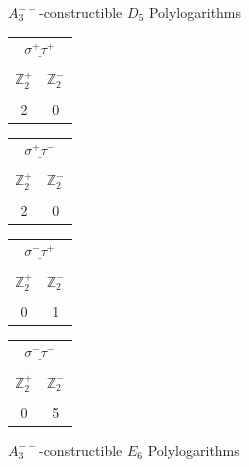 \documentclass[11pt]{article}
\begin{document}
\begin{table}
\begin{center}
\vspace{.6cm}
$A_3^{--}$-constructible $D_5$ Polylogarithms
\vspace{.2cm}

\begin{tabular}{c | c |}
\multicolumn{2}{c}{$\underline{\ \sigma^+ \tau^+ \ }$} \\[-1em]
\multicolumn{1}{c}{} & \multicolumn{1}{c}{} \\
 $\mathbb{Z}_2^+$ & \multicolumn{1}{c}{$\mathbb{Z}_2^-$} \\[-1em]
 & \multicolumn{1}{c}{} \\
\hline
2 & \multicolumn{1}{c}{0} 
\end{tabular} 
\hspace{1.2cm}
\begin{tabular}{ c | c |}
\multicolumn{2}{c}{$\underline{\ \sigma^+ \tau^-\ }$} \\[-1em]
\multicolumn{1}{c}{} & \multicolumn{1}{c}{} \\
 $\mathbb{Z}_2^+$ & \multicolumn{1}{c}{$\mathbb{Z}_2^-$} \\[-1em]
 & \multicolumn{1}{c}{} \\
\hline
2 & \multicolumn{1}{c}{0} 
\end{tabular} 
\hspace{1.2cm}
\begin{tabular}{ c | c |}
\multicolumn{2}{c}{$\underline{\ \sigma^- \tau^+\ }$} \\[-1em]
\multicolumn{1}{c}{} & \multicolumn{1}{c}{} \\
 $\mathbb{Z}_2^+$ & \multicolumn{1}{c}{$\mathbb{Z}_2^-$} \\[-1em]
 & \multicolumn{1}{c}{} \\
\hline
0 & \multicolumn{1}{c}{1} 
\end{tabular} 
\hspace{1.2cm}
\begin{tabular}{ c | c |}
\multicolumn{2}{c}{$\underline{\ \sigma^- \tau^-\ }$} \\[-1em]
\multicolumn{1}{c}{} & \multicolumn{1}{c}{} \\
 $\mathbb{Z}_2^+$ & \multicolumn{1}{c}{$\mathbb{Z}_2^-$} \\[-1em]
 & \multicolumn{1}{c}{} \\
\hline
0 & \multicolumn{1}{c}{5} 
\end{tabular} 

\vspace{.6cm}
$A_3^{--}$-constructible $E_6$ Polylogarithms
\vspace{.2cm}


\end{center}
\end{table}
\end{document}
